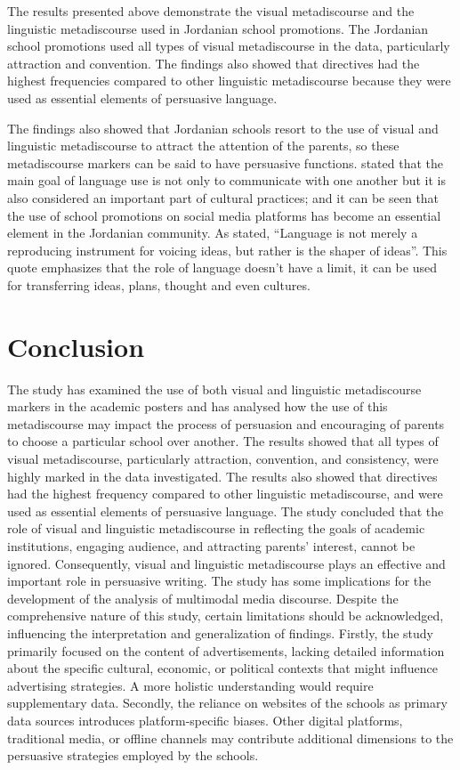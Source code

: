 \documentclass[english]{textolivre}
\begin{document}
The results presented above demonstrate the visual metadiscourse and the linguistic metadiscourse used in Jordanian school promotions. The Jordanian school promotions used all types of visual metadiscourse in the data, particularly attraction and convention. The findings also showed that directives had the highest frequencies compared to other linguistic metadiscourse because they were used as essential elements of persuasive language.

The findings also showed that Jordanian schools resort to the use of visual and linguistic metadiscourse to attract the attention of the parents, so these metadiscourse markers can be said to have persuasive functions. \textcite{duranti_linguistic_1997} stated that the main goal of language use is not only to communicate with one another but it is also considered an important part of cultural practices; and it can be seen that the use of school promotions on social media platforms has become an essential element in the Jordanian community. As \textcite[p.~214]{sapir_status_1929} stated, “Language is not merely a reproducing instrument for voicing ideas, but rather is the shaper of ideas”. This quote emphasizes that the role of language doesn’t have a limit, it can be used for transferring ideas, plans, thought and even cultures.

\section{Conclusion}
The study has examined the use of both visual and linguistic metadiscourse markers in the academic posters and has analysed how the use of this metadiscourse may impact the process of persuasion and encouraging of parents to choose a particular school over another. The results showed that all types of visual metadiscourse, particularly attraction, convention, and consistency, were highly marked in the data investigated. The results also showed that directives had the highest frequency compared to other linguistic metadiscourse, and were used as essential elements of persuasive language. The study concluded that the role of visual and linguistic metadiscourse in reflecting the goals of academic institutions, engaging audience, and attracting parents’ interest, cannot be ignored. Consequently, visual and linguistic metadiscourse plays an effective and important role in persuasive writing. The study has some implications for the development of the analysis of multimodal media discourse. Despite the comprehensive nature of this study, certain limitations should be acknowledged, influencing the interpretation and generalization of findings. Firstly, the study primarily focused on the content of advertisements, lacking detailed information about the specific cultural, economic, or political contexts that might influence advertising strategies. A more holistic understanding would require supplementary data. Secondly, the reliance on websites of the schools as primary data sources introduces platform-specific biases. Other digital platforms, traditional media, or offline channels may contribute additional dimensions to the persuasive strategies employed by the schools.
\end{document}
